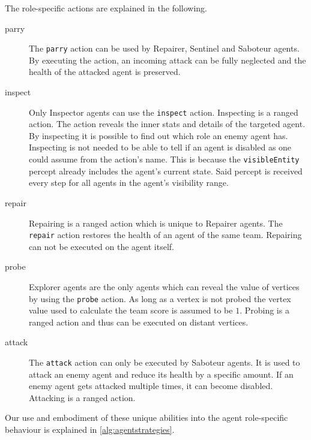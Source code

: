 The role-specific actions are explained in the following.
\begin{description}
   \item[parry] The \texttt{parry} action can be used by Repairer, Sentinel and Saboteur agents.
    By executing the action, an incoming attack can be fully neglected and the health of the attacked agent is preserved.
   \item[inspect] Only Inspector agents can use the \texttt{inspect} action.
    Inspecting is a ranged action.
    The action reveals the inner stats and details of the targeted agent.
    By inspecting it is possible to find out which role an enemy agent has.
    Inspecting is not needed to be able to tell if an agent is disabled as one could assume from the action's name.
    This is because the \texttt{visibleEntity} percept already includes the agent's current state.
    Said percept is received every step for all agents in the agent's visibility range.
   \item[repair] Repairing is a ranged action which is unique to Repairer agents.
    The \texttt{repair} action restores the health of an agent of the same team.
    Repairing can not be executed on the agent itself.
   \item[probe] Explorer agents are the only agents which can reveal the value of vertices by using the \texttt{probe} action.
    As long as a vertex is not probed the vertex value used to calculate the team score is assumed to be $1$.
    Probing is a ranged action and thus can be executed on distant vertices.
   \item[attack] The \texttt{attack} action can only be executed by Saboteur agents.
     It is used to attack an enemy agent and reduce its health by a specific amount.
     If an enemy agent gets attacked multiple times, it can become disabled.
     Attacking is a ranged action.
\end{description}

Our use and embodiment of these unique abilities into the agent role-specific behaviour is explained in \autoref{alg:agentstrategies}.
